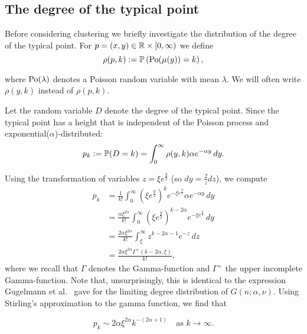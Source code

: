 \subsection{The degree of the typical point\label{ssec:degrees_infinite_model}}





Before considering clustering we briefly investigate the distribution of the degree of 
the typical point. 
For $p = (x,y) \in {\mathbb R}\times[0,\infty)$ we define
\begin{equation}
	\rho(p,k) := \mathbb{P}\left({\mathrm{Po}}(\mu(y)) = k\right),
\end{equation}

where ${\mathrm{Po}}(\lambda)$ denotes a Poisson random variable with mean $\lambda$. 
We will often write $\rho(y,k)$ instead of $\rho(p,k)$.

Let the random variable $D$ denote the degree of the typical point.
Since the typical point has a height that is independent of the Poisson process and exponential($\alpha$)-distributed:
\begin{equation}\label{eq:def_pk}
	p_k := \mathbb{P}( D=k ) = \int_0^\infty \rho(y,k) \alpha e^{-\alpha y} \, dy.
\end{equation}

Using the transformation of variables $z = \xi e^{\frac{y}{2}}$ (so $dy = \frac{2}{z}dz$), we compute
\begin{align*}
	p_k
    &= \frac{1}{k!} \int_0^\infty \left(\xi e^{\frac{y}{2}}\right)^k 
    	e^{-\xi e^{\frac{y}{2}}} \alpha e^{-\alpha y} \, dy\\
    &= \frac{\alpha \xi^{2\alpha}}{k!} \int_0^\infty 
    	\left(\xi e^{\frac{y}{2}}\right)^{k - 2\alpha} e^{-\xi e^{\frac{y}{2}}}
        \, dy\\
    &= \frac{2\alpha \xi^{2\alpha}}{k!} \int_{\xi}^{\infty} 
    	z^{k -2\alpha-1} e^{-z} \, dz\\
    &= \frac{2\alpha \xi^{2\alpha}\Gamma^+(k - 2\alpha, \xi)}{k!},
\end{align*}
where we recall that $\Gamma$ denotes the Gamma-function and $\Gamma^{+}$ the upper incomplete Gamma-function.
Note that, unsurprisingly, this is identical to the expression Gugelmann et al.~\cite{gugelmann2012random} gave for the limiting degree distribution of $G(n;\alpha,\nu)$. Using Stirling's approximation to the gamma function, we find that 

\begin{equation}\label{eq:degree_distribution_P_asymptotics}
	p_k \sim 2\alpha\xi^{2\alpha} k^{-(2\alpha + 1)}
	\quad \text{as } k \to \infty.
\end{equation}

